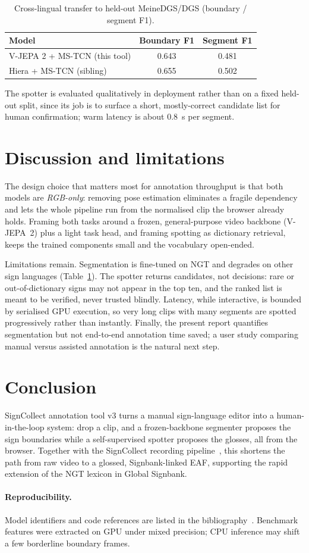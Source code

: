 \documentclass[11pt]{article}
\begin{document}
\begin{table}[t]
\centering
\caption{Cross-lingual transfer to held-out MeineDGS/DGS (boundary / segment F1).}
\label{tab:dgs}
\small
\begin{tabular}{lcc}
\toprule
Model & Boundary F1 & Segment F1 \\
\midrule
V-JEPA 2 + MS-TCN (this tool) & 0.643 & 0.481 \\
Hiera + MS-TCN (sibling)      & 0.655 & 0.502 \\
\bottomrule
\end{tabular}
\end{table}

\noindent\small The spotter is evaluated qualitatively in deployment rather than on a fixed held-out
split, since its job is to surface a short, mostly-correct candidate list for human confirmation;
warm latency is about 0.8~s per segment.\normalsize

\section{Discussion and limitations}\label{sec:discussion}
The design choice that matters most for annotation throughput is that both models are
\emph{RGB-only}: removing pose estimation eliminates a fragile dependency and lets the whole pipeline
run from the normalised clip the browser already holds. Framing both tasks around a frozen,
general-purpose video backbone (V-JEPA~2) plus a light task head, and framing spotting as dictionary
retrieval, keeps the trained components small and the vocabulary open-ended.

Limitations remain. Segmentation is fine-tuned on NGT and degrades on other sign languages
(Table~\ref{tab:dgs}). The spotter returns candidates, not decisions: rare or out-of-dictionary signs
may not appear in the top ten, and the ranked list is meant to be verified, never trusted blindly.
Latency, while interactive, is bounded by serialised GPU execution, so very long clips with many
segments are spotted progressively rather than instantly. Finally, the present report quantifies
segmentation but not end-to-end annotation time saved; a user study comparing manual versus assisted
annotation is the natural next step.

\section{Conclusion}\label{sec:conclusion}
SignCollect annotation tool v3 turns a manual sign-language editor into a human-in-the-loop system:
drop a clip, and a frozen-backbone segmenter proposes the sign boundaries while a self-supervised
spotter proposes the glosses, all from the browser. Together with the SignCollect recording
pipeline~\citep{signcollect}, this shortens the path from raw video to a glossed, Signbank-linked
EAF, supporting the rapid extension of the NGT lexicon in Global Signbank.

\paragraph{Reproducibility.} Model identifiers and code references are listed in the
bibliography~\citep{tools}. Benchmark features were extracted on GPU under mixed precision; CPU
inference may shift a few borderline boundary frames.



\end{document}
